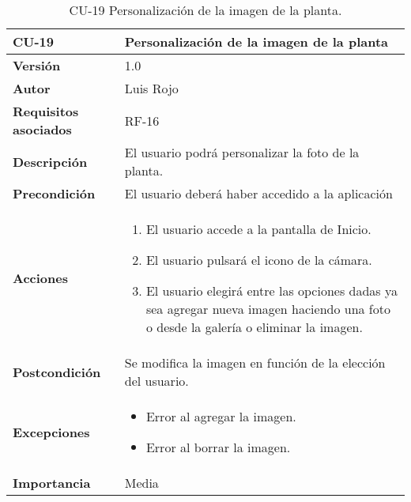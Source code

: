 \begin{table}[p]
	\centering
	\begin{tabularx}{\linewidth}{ p{} p{} }
		\toprule
		\textbf{CU-19}    & \textbf{Personalización de la imagen de la planta}\\
		\toprule
		\textbf{Versión}              & 1.0    \\
		\textbf{Autor}                & Luis Rojo \\
		\textbf{Requisitos asociados} & RF-16 \\
		\textbf{Descripción}          & El usuario podrá personalizar la foto de la planta. \\
		\textbf{Precondición}         &  El usuario deberá haber accedido a la aplicación \\
		\textbf{Acciones}             &
		\begin{enumerate}
			\def\labelenumi{\arabic{enumi}.}
			\tightlist
			\item El usuario accede a la pantalla de Inicio.
                \item El usuario pulsará el icono de la cámara.
                \item El usuario elegirá entre las opciones dadas ya sea agregar nueva imagen haciendo una foto o desde la galería o eliminar la imagen.
		\end{enumerate}\\
		\textbf{Postcondición}        & Se modifica la imagen en función de la elección del usuario.  \\
		\textbf{Excepciones}          &  
            \begin{itemize}
                \item Error al agregar la imagen.
                \item Error al borrar la imagen.
            \end{itemize}
           \\
		\textbf{Importancia}          & Media  \\
		\bottomrule
	\end{tabularx}
	\caption{CU-19 Personalización de la imagen de la planta.}
\end{table}

